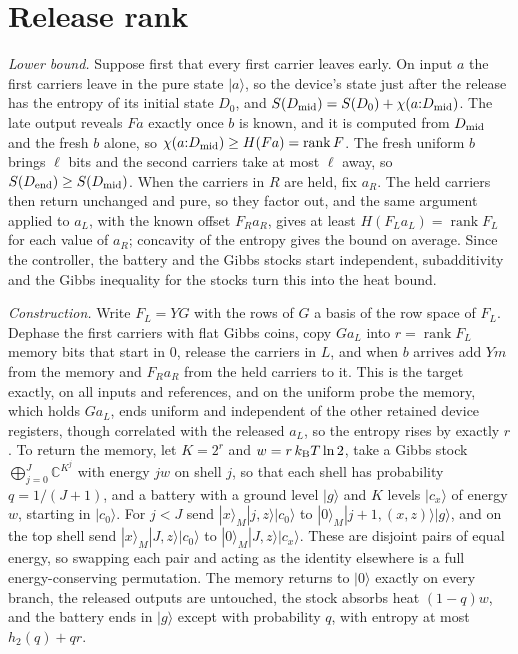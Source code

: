 \section{Release rank}\label{to:app:rank}

\emph{Lower bound.} Suppose first that every first carrier leaves early. On input $a$ the first carriers leave in the pure state $|a\rangle$, so the device's state just after the release has the entropy of its initial state $D_0$, and $S(D_{\rm mid})=S(D_0)+\chi(a{:}D_{\rm mid})$. The late output reveals $Fa$ exactly once $b$ is known, and it is computed from $D_{\rm mid}$ and the fresh $b$ alone, so $\chi(a{:}D_{\rm mid})\ge H(Fa)=\operatorname{rank}F$. The fresh uniform $b$ brings $\ell$ bits and the second carriers take at most $\ell$ away, so $S(D_{\rm end})\ge S(D_{\rm mid})$. When the carriers in $R$ are held, fix $a_R$. The held carriers then return unchanged and pure, so they factor out, and the same argument applied to $a_L$, with the known offset $F_Ra_R$, gives at least $H(F_La_L)=\operatorname{rank}F_L$ for each value of $a_R$; concavity of the entropy gives the bound on average. Since the controller, the battery and the Gibbs stocks start independent, subadditivity and the Gibbs inequality for the stocks turn this into the heat bound.

\emph{Construction.} Write $F_L=YG$ with the rows of $G$ a basis of the row space of $F_L$. Dephase the first carriers with flat Gibbs coins, copy $Ga_L$ into $r=\operatorname{rank}F_L$ memory bits that start in $0$, release the carriers in $L$, and when $b$ arrives add $Ym$ from the memory and $F_Ra_R$ from the held carriers to it. This is the target exactly, on all inputs and references, and on the uniform probe the memory, which holds $Ga_L$, ends uniform and independent of the other retained device registers, though correlated with the released $a_L$, so the entropy rises by exactly $r$. To return the memory, let $K=2^r$ and $w=r\,k_{\mathrm B} T\ln2$, take a Gibbs stock $\bigoplus_{j=0}^J\mathbb C^{K^j}$ with energy $jw$ on shell $j$, so that each shell has probability $q=1/(J+1)$, and a battery with a ground level $|g\rangle$ and $K$ levels $|c_x\rangle$ of energy $w$, starting in $|c_0\rangle$. For $j<J$ send $|x\rangle_M|j,z\rangle|c_0\rangle$ to $|0\rangle_M|j+1,(x,z)\rangle|g\rangle$, and on the top shell send $|x\rangle_M|J,z\rangle|c_0\rangle$ to $|0\rangle_M|J,z\rangle|c_x\rangle$. These are disjoint pairs of equal energy, so swapping each pair and acting as the identity elsewhere is a full energy-conserving permutation. The memory returns to $|0\rangle$ exactly on every branch, the released outputs are untouched, the stock absorbs heat $(1-q)w$, and the battery ends in $|g\rangle$ except with probability $q$, with entropy at most $h_2(q)+qr$.


